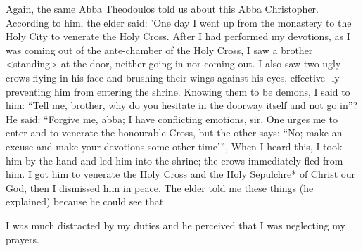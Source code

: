 Again, the same Abba Theodoulos told us about this Abba
Christopher. According to him, the elder said: 'One day I went up
from the monastery to the Holy City to venerate the Holy Cross.
After I had performed my devotions, as I was coming out of the
ante-chamber of the Holy Cross, I saw a brother <standing> at the
door, neither going in nor coming out. I also saw two ugly crows
flying in his face and brushing their wings against his eyes, effective-
ly preventing him from entering the shrine. Knowing them to be
demons, I said to him: “Tell me, brother, why do you hesitate in the
doorway itself and not go in”? He said: “Forgive me, abba; I have
conflicting emotions, sir. One urges me to enter and to venerate the
honourable Cross, but the other says: “No; make an excuse and
make your devotions some other time'”, When I heard this, I took
him by the hand and led him into the shrine; the crows immediately
fled from him. I got him to venerate the Holy Cross and the Holy
Sepulchre* of Christ our God, then I dismissed him in peace. The
elder told me these things (he explained) because he could see that

I was much distracted by my duties and he perceived that I was
neglecting my prayers.

